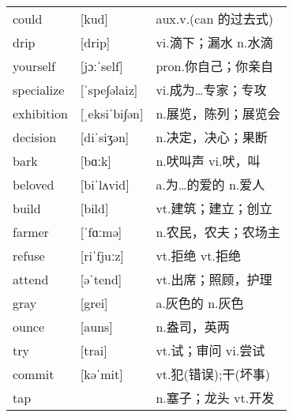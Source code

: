 \documentclass[a4paper]{article}
\begin{document}
\section{}
\begin{tabular}{l l l}

could & [kud] & aux.v.(can 的过去式) \\
drip & [drip] & vi.滴下；漏水 n.水滴 \\
yourself & [jɔːˈself] & pron.你自己；你亲自 \\
specialize & [ˈspe∫əlaiz] & vi.成为…专家；专攻 \\
exhibition & [ˌeksiˈbi∫ən] & n.展览，陈列；展览会 \\
decision & [diˈsiʒən] & n.决定，决心；果断 \\
bark & [bɑːk] & n.吠叫声 vi.吠，叫 \\
beloved & [biˈlʌvid] & a.为…的爱的 n.爱人 \\
build & [bild] & vt.建筑；建立；创立 \\
farmer & [ˈfɑːmə] & n.农民，农夫；农场主 \\
refuse & [riˈfjuːz] & vt.拒绝 vt.拒绝 \\
attend & [əˈtend] & vt.出席；照顾，护理 \\
gray & [grei] & a.灰色的 n.灰色 \\
ounce & [auns] & n.盎司，英两 \\
try & [trai] & vt.试；审问 vi.尝试 \\
commit & [kəˈmit] & vt.犯(错误);干(坏事) \\
tap &  & n.塞子；龙头 vt.开发 \\

\end{tabular}
\end{document}
